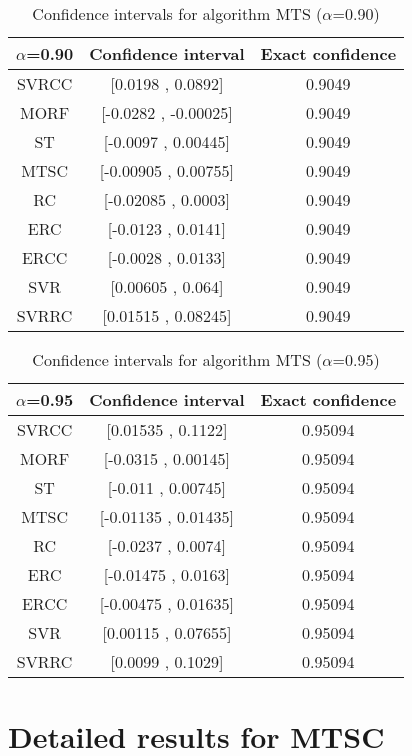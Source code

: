 \documentclass[a4paper,10pt]{article}
\begin{document}
\begin{table}[!htp]
\centering\small
\begin{tabular}{
|c|c|c|}
\hline
 $\alpha$=0.90 & Confidence interval & Exact confidence \\ \hline 
SVRCC & [0.0198 , 0.0892] & 0.9049\\ \hline 
MORF & [-0.0282 , -0.00025] & 0.9049\\ \hline 
ST & [-0.0097 , 0.00445] & 0.9049\\ \hline 
MTSC & [-0.00905 , 0.00755] & 0.9049\\ \hline 
RC & [-0.02085 , 0.0003] & 0.9049\\ \hline 
ERC & [-0.0123 , 0.0141] & 0.9049\\ \hline 
ERCC & [-0.0028 , 0.0133] & 0.9049\\ \hline 
SVR & [0.00605 , 0.064] & 0.9049\\ \hline 
SVRRC & [0.01515 , 0.08245] & 0.9049\\ \hline 

\end{tabular}
\caption{Confidence intervals for algorithm MTS ($\alpha$=0.90)}
\end{table}
\begin{table}[!htp]
\centering\small
\begin{tabular}{
|c|c|c|}
\hline
 $\alpha$=0.95 & Confidence interval & Exact confidence \\ \hline 
SVRCC & [0.01535 , 0.1122] & 0.95094\\ \hline 
MORF & [-0.0315 , 0.00145] & 0.95094\\ \hline 
ST & [-0.011 , 0.00745] & 0.95094\\ \hline 
MTSC & [-0.01135 , 0.01435] & 0.95094\\ \hline 
RC & [-0.0237 , 0.0074] & 0.95094\\ \hline 
ERC & [-0.01475 , 0.0163] & 0.95094\\ \hline 
ERCC & [-0.00475 , 0.01635] & 0.95094\\ \hline 
SVR & [0.00115 , 0.07655] & 0.95094\\ \hline 
SVRRC & [0.0099 , 0.1029] & 0.95094\\ \hline 

\end{tabular}
\caption{Confidence intervals for algorithm MTS ($\alpha$=0.95)}
\end{table}

 \clearpage 


\section{Detailed results for MTSC}
\end{document}
